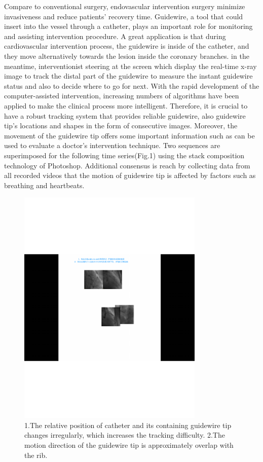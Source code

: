 \documentclass[letterpaper, 10 pt, conference]{ieeeconf}  %
\begin{document}
Compare to conventional surgery, endovascular intervention surgery minimize invasiveness and reduce patients' recovery time. Guidewire, a tool that could insert into the vessel through a catheter, plays an important role for monitoring and assisting intervention procedure. A great application is that during cardiovascular intervention process, the guidewire is inside of the catheter, and they move alternatively towards the lesion inside the coronary branches. in the meantime, interventionist steering at the screen which display the real-time x-ray image to track the distal part of the guidewire to measure the instant guidewire status and also to decide where to go for next. With the rapid development of the computer-assisted intervention, increasing numbers of algorithms have been applied to make the clinical process more intelligent. Therefore, it is crucial to have a robust tracking system that provides reliable guidewire, also guidewire tip's locations and shapes in the form of consecutive images. Moreover, the movement of the guidewire tip offers some important information such as can be used to evaluate a doctor's intervention technique. Two sequences are superimposed for the following time series(Fig.1) using the stack composition technology of Photoshop. Additional consensus is reach by collecting data from all recorded videos that the motion of guidewire tip is affected by factors such as breathing and heartbeats.

\begin{figure}[thpb]
	\centering
	\includegraphics[width=3.5in]{figure1.eps}
		\caption{1.The relative position of catheter and its containing guidewire tip changes irregularly, which increases the tracking difficulty. 2.The motion direction of the guidewire tip is approximately overlap with the rib. } 
	\label{fig.mcmthesis-logo} 
\end{figure}
\end{document}
